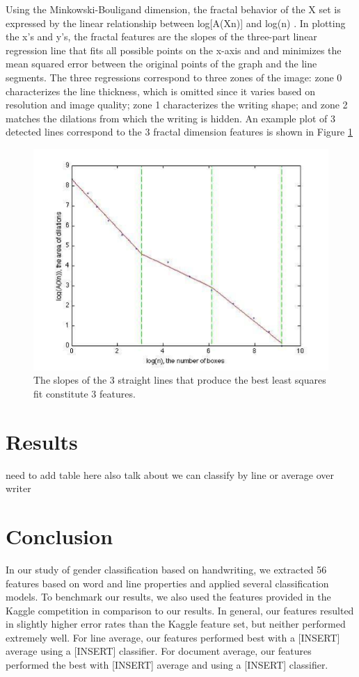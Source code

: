 \documentclass[paper=a4, fontsize=11pt]{scrartcl} %
\numberwithin{equation}{section} %
\numberwithin{figure}{section} %
\numberwithin{table}{section} %
\begin{document}
Using the Minkowski-Bouligand dimension, the fractal behavior of the X
set is expressed by the linear relationship between log[A(Xn)] and
log(n) \cite{SyntheticParameters}. In plotting the x's and y's, the
fractal features are the slopes of the three-part linear regression
line that fits all possible points on the x-axis and and minimizes the
mean squared error between the original points of the graph and the
line segments\cite{GeometricalFeatures}.  The three regressions
correspond to three zones of the image: zone 0 characterizes the line
thickness, which is omitted since it varies based on resolution and
image quality; zone 1 characterizes the writing shape; and zone 2
matches the dilations from which the writing is hidden. An example
plot of 3 detected lines correspond to the 3 fractal dimension
features is shown in Figure \ref{fig:fractaldimension}

\begin{figure}
  \centering \includegraphics{fractaldimension.png}
  \caption{The slopes of the 3 straight lines that produce the best
    least squares fit constitute 3 features.}
  \label{fig:fractaldimension}
\end{figure}

\section{Results}
need to add table here
also talk about we can classify by line or average over writer
\label{sec:results}
\section{Conclusion}
In our study of gender classification based on handwriting, we
extracted 56 features based on word and line properties and applied
several classification models. To benchmark our results, we also used
the features provided in the Kaggle competition in comparison to our
results. In general, our features resulted in slightly higher error
rates than the Kaggle feature set, but neither performed extremely
well. For line average, our features performed best with a [INSERT]
average using a [INSERT] classifier. For document average, our
features performed the best with [INSERT] average and using a [INSERT]
classifier.
\end{document}
